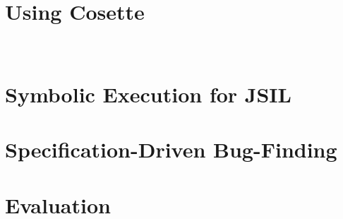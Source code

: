 \documentclass[sigconf, review]{acmart}
\newcommand{\jsil}{JSIL\xspace}
\newcommand{\polish}[1]{{\color{red}#1}}
\newcommand{\cosette}{Cosette\xspace}
\newcommand{\myparagraph}[1]{\smallskip\noindent {\bf #1.}\hspace{1pt}}
\begin{document}
%
%
%
%




\section{Using \cosette}\label{sec:overview}


\newpage\ \newpage
\section{Symbolic Execution for \jsil}\label{sec:jsil:symb:exec}


\section{Specification-Driven Bug-Finding}\label{sec:specs}


%

\section{Evaluation}\label{sec:evaluation}

\end{document}
